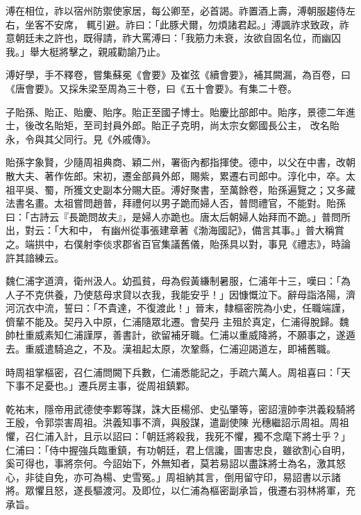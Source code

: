 \begin{pinyinscope}
 溥在相位，祚以宿州防禦使家居，每公卿至，必首謁。祚置酒上壽，溥朝服趨侍左右，坐客不安席，
 輒引避。祚曰：「此豚犬爾，勿煩諸君起。」溥諷祚求致政，祚意朝廷未之許也，既得請，祚大罵溥曰：「我筋力未衰，汝欲自固名位，而幽囚我。」舉大梃將擊之，親戚勸諭乃止。



 溥好學，手不釋卷，嘗集蘇冕《會要》及崔弦《續會要》，補其闕漏，為百卷，曰《唐會要》。又採朱梁至周為三十卷，曰《五十會要》。有集二十卷。



 子貽孫、貽正、貽慶、貽序。貽正至國子博士。貽慶比部郎中。貽序，景德二年進士，後改名貽矩，至司封員外郎。貽正子克明，尚太宗女鄭國長公主，
 改名貽永，令與其父同行。見《外戚傳》。



 貽孫字象賢，少隨周祖典商、穎二州，署衙內都指揮使。德中，以父在中書，改朝散大夫、著作佐郎。宋初，遷金部員外郎，賜紫，累遷右司郎中。淳化中，卒。太祖平吳、蜀，所獲文史副本分賜大臣。溥好聚書，至萬餘卷，貽孫遍覽之；又多藏法書名畫。太祖嘗問趙普，拜禮何以男子跪而婦人否，普問禮官，不能對。貽孫曰：「古詩云『長跪問故夫』，是婦人亦跪也。唐太后朝婦人始拜而不跪。」普問所出，對云：「大和中，
 有幽州從事張建章著《渤海國記》，備言其事。」普大稱賞之。端拱中，右僕射李倓求郡省百官集議舊儀，貽孫具以對，事見《禮志》，時論許其諳練云。



 魏仁浦字道濟，衛州汲人。幼孤貧，母為假黃縑制暑服，仁浦年十三，嘆曰：「為人子不克供養，乃使慈母求貸以衣我，我能安乎！」因慷慨泣下。辭母詣洛陽，濟河沉衣中流，誓曰：「不貴達，不復渡此！」晉末，隸樞密院為小史，任職端謹，儕輩不能及。契丹入中原，仁浦隨眾北遷。會契丹
 主殂於真定，仁浦得脫歸。魏帥杜重威素知仁浦謹厚，善書計，欲留補牙職。仁浦以重威降將，不願事之，遂遁去。重威遣騎追之，不及。漢祖起太原，次鞏縣，仁浦迎謁道左，即補舊職。



 時周祖掌樞密，召仁浦問闕下兵數，仁浦悉能記之，手疏六萬人。周祖喜曰：「天下事不足憂也。」遷兵房主事，從周祖鎮鄴。



 乾祐末，隱帝用武德使李鄴等謀，誅大臣楊邠、史弘肇等，密詔澶帥李洪義殺騎將王殷，令郭崇害周祖。洪義知事不濟，與殷謀，遣副使陳
 光穗繼詔示周祖。周祖懼，召仁浦入計，且示以詔曰：「朝廷將殺我，我死不懼，獨不念麾下將士乎？」仁浦曰：「侍中握強兵臨重鎮，有功朝廷，君上信讒，圖害忠良，雖欲割心自明，奚可得也，事將奈何。今詔始下，外無知者，莫若易詔以盡誅將士為名，激其怒心，非徒自免，亦可為楊、史雪冤。」周祖納其言，倒用留守印，易詔書以示諸將。眾懼且怒，遂長驅渡河。及即位，以仁浦為樞密副承旨，俄遷右羽林將軍，充承旨。




\end{pinyinscope}
